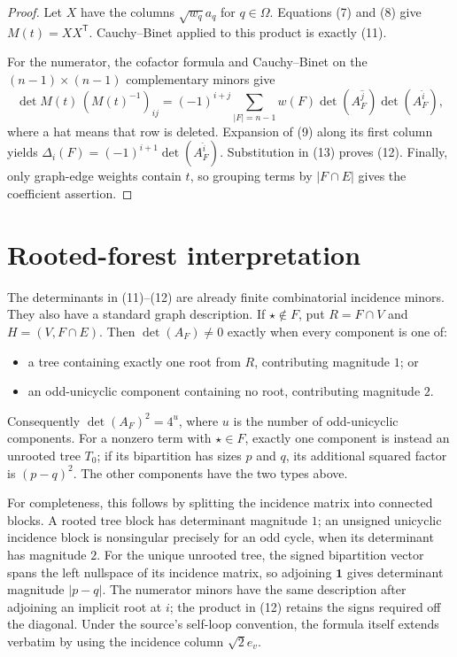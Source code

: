 \documentclass[10pt]{article}
\newcommand{\one}{\mathbf 1}
\begin{document}
\begin{proof}
Let $X$ have the columns $\sqrt{w_q}a_q$ for $q\in\Omega$.  Equations (7)
and (8) give $M(t)=XX^{\mathsf T}$.  Cauchy--Binet applied to this product is
exactly (11).

For the numerator, the cofactor formula and Cauchy--Binet on the
$(n-1)\times(n-1)$ complementary minors give
\[
 \det M(t)\,(M(t)^{-1})_{ij}
 =(-1)^{i+j}\!\sum_{|F|=n-1}w(F)
   \det(A_F^{\widehat j})\det(A_F^{\widehat i}),           \tag{13}
\]
where a hat means that row is deleted.  Expansion of (9) along its first
column yields
$\Delta_i(F)=(-1)^{i+1}\det(A_F^{\widehat i})$.
Substitution in (13) proves (12).  Finally, only graph-edge weights contain
$t$, so grouping terms by $|F\cap E|$ gives the coefficient assertion.
\end{proof}

\section*{Rooted-forest interpretation}

The determinants in (11)--(12) are already finite combinatorial incidence
minors.  They also have a standard graph description.  If $\star\notin F$,
put $R=F\cap V$ and $H=(V,F\cap E)$.  Then $\det(A_F)\ne0$ exactly when
every component is one of:
\begin{itemize}
\item a tree containing exactly one root from $R$, contributing magnitude
      $1$; or
\item an odd-unicyclic component containing no root, contributing magnitude
      $2$.
\end{itemize}
Consequently $\det(A_F)^2=4^u$, where $u$ is the number of odd-unicyclic
components.  For a nonzero term with $\star\in F$, exactly one component is
instead an unrooted tree $T_0$; if its bipartition has sizes $p$ and $q$, its
additional squared factor is $(p-q)^2$.  The other components have the two
types above.

For completeness, this follows by splitting the incidence matrix into
connected blocks.  A rooted tree block has determinant magnitude $1$; an
unsigned unicyclic incidence block is nonsingular precisely for an odd cycle,
when its determinant has magnitude $2$.  For the unique unrooted tree, the
signed bipartition vector spans the left nullspace of its incidence matrix,
so adjoining $\one$ gives determinant magnitude $|p-q|$.  The numerator
minors have the same description after adjoining an implicit root at $i$;
the product in (12) retains the signs required off the diagonal.  Under the
source's self-loop convention, the formula itself extends verbatim by using
the incidence column $\sqrt2e_v$.
\end{document}
